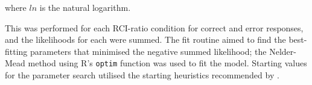 \documentclass[a4paper, jou, natbib]{apa6}
\begin{document}
\noindent where $ln$ is the natural logarithm.

This was performed for each RCI-ratio condition for correct and error responses, and the likelihoods for each were summed. The fit routine aimed to find the best-fitting parameters that minimised the negative summed likelihood; the Nelder-Mead method using R's \texttt{optim} function was used to fit the model. Starting values for the parameter search utilised the starting heuristics recommended by  \cite{Donkin2011}.





\end{document}
